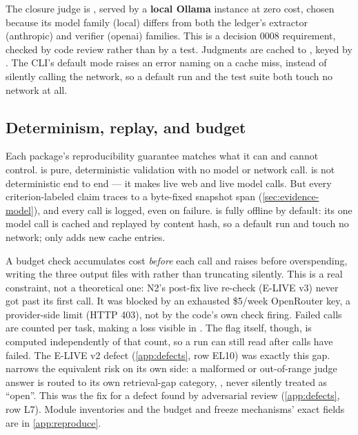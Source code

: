 \evobs{} The closure judge is , served by a \textbf{local Ollama} instance at
zero cost, chosen because its model family (local) differs from both the ledger's extractor
(anthropic) and verifier (openai) families. This is a decision 0008 requirement, checked by code
review rather than by a test. Judgments are cached to ,
keyed by . The CLI's default mode raises an error naming
 on a cache miss, instead of silently calling the network, so a default run
and the test suite both touch no network at all.

\subsection{Determinism, replay, and budget}

Each package's reproducibility guarantee matches what it can and cannot control. \evobs{}
 is pure, deterministic  validation with no model or network call.
 is not deterministic end to end --- it makes live web and live model calls. But
every criterion-labeled claim traces to a byte-fixed snapshot span (\cref{sec:evidence-model}), and
every call is logged, even on failure.  is fully offline by default: its one
model call is cached and replayed by content hash, so a default run and  touch no
network; only  adds new cache entries.

A budget check accumulates cost \emph{before} each call and raises before overspending, writing the
three output files with  rather than truncating silently. This is a real
constraint, not a theoretical one: N2's post-fix live re-check (E-LIVE v3) never got past its
first call. It was blocked by an exhausted \$5/week OpenRouter key, a provider-side limit
(HTTP 403), not by the code's own check firing. Failed calls are counted per task, making a loss
visible in . The  flag itself, though, is computed independently
of that count, so a run can still read  after calls have failed. The E-LIVE v2
defect (\cref{app:defects}, row EL10) was exactly this gap.  narrows the equivalent
risk on its own side: a malformed or out-of-range judge answer is routed to its own retrieval-gap
category, , never silently treated as \enquote{open}. This was the fix for a
defect found by adversarial review (\cref{app:defects}, row L7). Module inventories and the budget
and freeze mechanisms' exact fields are in \cref{app:reproduce}.
